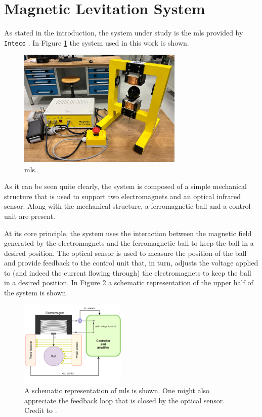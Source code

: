 \section{Magnetic Levitation System}
\label{sec:magnetic_levitation_system}

As stated in the introduction, the system under study is the \acrfull{mls} provided by \texttt{Inteco} \cite{IntecoMLS}.
In Figure \ref{fig:MLS} the system used in this work is shown.

\begin{figure}[H]
    \centering
    \includegraphics[width=0.7\textwidth]{./img/Maglev_from_the_lab.jpeg}
    \caption{\acrlong{mls}.}
    \label{fig:MLS}
\end{figure}

As it can be seen quite clearly, the system is composed of a simple mechanical structure that is used to support two electromagnets and an optical infrared sensor.
Along with the mechanical structure, a ferromagnetic ball and a control unit are present.

At its core principle, the system uses the interaction between the magnetic field generated by the electromagnets and the ferromagnetic ball to keep the ball in a desired position.
The optical sensor is used to measure the position of the ball and provide feedback to the control unit that, in turn, adjusts the voltage applied to (and indeed the current flowing through) the electromagnets to keep the ball in a desired position.
In Figure \ref{fig:MLS_general_scheme} a schematic representation of the upper half of the system is shown.

\begin{figure}[H]
    \centering
    \includegraphics[width=0.45\textwidth]{./img/magLev_general_scheme.png}
    \caption{A schematic representation of \acrshort{mls} is shown. One might also appreciate the feedback loop that is closed by the optical sensor. Credit to \cite{Jastrzębski2024}.}
    \label{fig:MLS_general_scheme}
\end{figure}

